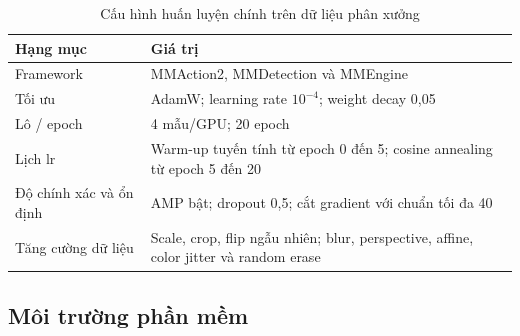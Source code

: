 \begin{table}[htbp]
\centering
\caption[Cấu hình huấn luyện trên dữ liệu phân xưởng]{Cấu hình huấn luyện chính trên dữ liệu phân xưởng}
\label{tab:factory-config}
\small
\begin{tabularx}{\textwidth}{lX}
\toprule
\textbf{Hạng mục} & \textbf{Giá trị}\\
\midrule
Framework & MMAction2, MMDetection và MMEngine\\
Tối ưu & AdamW; learning rate $10^{-4}$; weight decay 0,05\\
Lô / epoch & 4 mẫu/GPU; 20 epoch\\
Lịch lr & Warm-up tuyến tính từ epoch 0 đến 5; cosine annealing từ epoch 5 đến 20\\
Độ chính xác và ổn định & AMP bật; dropout 0,5; cắt gradient với chuẩn tối đa 40\\
Tăng cường dữ liệu & Scale, crop, flip ngẫu nhiên; blur, perspective, affine, color jitter và random erase\\
\bottomrule
\end{tabularx}
\end{table}

\subsection{Môi trường phần mềm}
\label{sec:software}

